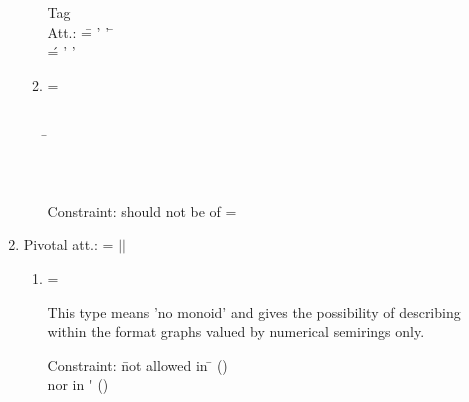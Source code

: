 \begin{enumerate}
\begin{enumerate}
\begin{tabbing}
\ptn Tag  \\
\tagindent\ptn Att.:  \= = ' '
                                     \tagsp \=  \strng  \req \+ \\
         \' = ' '  \tagsp   \> \strng  \req
\end{tabbing}



\item  {} = 

\begin{tabbing}
      \\[\taglnskp]
\tagindent{}\tagsp\= \kill
\tagindent{}\> \oneocc \opt\\[\taglnskp]
\tagindent{}\> \oneocc \req\\[\taglnskp]
\tagindent{} \> \oneocc \req\\[\taglnskp]
\end{tabbing}

\ptn Constraint:  should not be of  = 

\end{enumerate}
\clearpage  

\item  {}

\begin{tabbing}
\ptn Pivotal att.:  =
            $|$$|$  \tagsp   \token   \req
\end{tabbing}

\begin{enumerate}

\item  {} = 

\smallskip
This type means 'no monoid' and gives the possibility of describing
     within the format graphs valued by numerical semirings only.

\begin{tabbing}
\end{tabbing}

\begin{tabbing}
\ptn Constraint: 
\= not allowed in  \=  ()\\
\>\>   nor in \'  ()\\
\end{tabbing}


\end{enumerate}
\end{enumerate}
